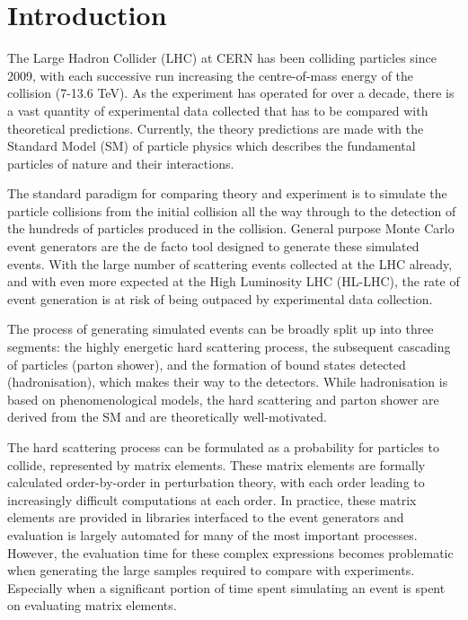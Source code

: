 \documentclass[main.tex]{subfiles}
\begin{document}
\chapter{Introduction}
\label{chapter:intro}

The Large Hadron Collider (LHC) at CERN has been colliding
particles since 2009, with each successive run increasing the centre-of-mass
energy of the collision (7-13.6 TeV). As the experiment has
operated for over a decade, there is a vast quantity of
experimental data collected that has to be compared with
theoretical predictions. Currently, the theory predictions
are made with the Standard Model (SM) of
particle physics which describes the fundamental particles
of nature and their interactions.

The standard paradigm for comparing
theory and experiment is to simulate the particle collisions
from the initial collision all the way through
to the detection of the hundreds of particles produced in the collision.
General purpose Monte Carlo event generators are the de facto
tool designed to generate these simulated events.
With the large number of scattering events collected at
the LHC already, and with even more expected at the High Luminosity LHC (HL-LHC),
the rate of event generation is at risk of
being outpaced by experimental data collection.

The process of generating simulated events can be broadly
split up into three segments:
the highly energetic hard scattering process, 
the subsequent cascading of particles (parton shower),
and the formation of bound states detected (hadronisation),
which makes their way to the detectors.
While hadronisation is based on phenomenological models,
the hard scattering and parton shower are derived
from the SM and are theoretically well-motivated.

The hard scattering process can be formulated as a probability
for particles to collide, represented by matrix elements.
These matrix elements are formally calculated order-by-order
in perturbation theory, with each order leading
to increasingly difficult computations at each order. In practice,
these matrix elements are provided in libraries interfaced
to the event generators and evaluation is largely automated for many
of the most important processes. However, the evaluation time
for these complex expressions becomes problematic
when generating the large samples required to compare with
experiments. Especially when a significant portion of time
spent simulating an event is spent on evaluating matrix
elements.
\end{document}
